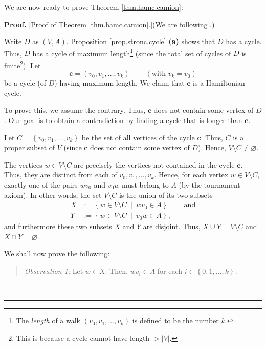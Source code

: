 \documentclass[numbers=enddot,12pt,final,onecolumn,notitlepage]{scrartcl}%
\numberwithin{exer}{subsection}
\theoremstyle{definition}
\newenvironment{statement}{\begin{quote}}{\end{quote}}
\newenvironment{proof}[1][Proof]{\noindent\textbf{#1.} }{\ \rule{0.5em}{0.5em}}
\begin{document}
We are now ready to prove Theorem \ref{thm.hamc.camion}:

\begin{proof}
[Proof of Theorem \ref{thm.hamc.camion}.](We are following \cite[\S 10.2,
Theorem 4]{Berge91}.)

Write $D$ as $\left(  V,A\right)  $. Proposition \ref{prop.stronc.cycle}
\textbf{(a)} shows that $D$ has a cycle. Thus, $D$ has a cycle of maximum
length\footnote{The \emph{length} of a walk $\left(  v_{0},v_{1},\ldots
,v_{k}\right)  $ is defined to be the number $k$.} (since the total set of
cycles of $D$ is finite\footnote{This is because a cycle cannot have length
$>\left\vert V\right\vert $.}). Let%
\[
\mathbf{c}=\left(  v_{0},v_{1},\ldots,v_{k}\right)
\ \ \ \ \ \ \ \ \ \ \left(  \text{with }v_{k}=v_{0}\right)
\]
be a cycle (of $D$) having maximum length. We claim that $\mathbf{c}$ is a
Hamiltonian cycle.

To prove this, we assume the contrary. Thus, $\mathbf{c}$ does not contain
some vertex of $D$. Our goal is to obtain a contradiction by finding a cycle
that is longer than $\mathbf{c}$.

Let $C=\left\{  v_{0},v_{1},\ldots,v_{k}\right\}  $ be the set of all vertices
of the cycle $\mathbf{c}$. Thus, $C$ is a proper subset of $V$ (since
$\mathbf{c}$ does not contain some vertex of $D$). Hence, $V\setminus
C\neq\varnothing$.

The vertices $w\in V\setminus C$ are precisely the vertices not contained in
the cycle $\mathbf{c}$. Thus, they are distinct from each of $v_{0}%
,v_{1},\ldots,v_{k}$. Hence, for each vertex $w\in V\setminus C$, exactly one
of the pairs $wv_{0}$ and $v_{0}w$ must belong to $A$ (by the tournament
axiom). In other words, the set $V\setminus C$ is the union of its two subsets%
\begin{align*}
X  &  :=\left\{  w\in V\setminus C\ \mid\ wv_{0}\in A\right\}
\ \ \ \ \ \ \ \ \ \ \text{and}\\
Y  &  :=\left\{  w\in V\setminus C\ \mid\ v_{0}w\in A\right\}  ,
\end{align*}
and furthermore these two subsets $X$ and $Y$ are disjoint. Thus, $X\cup
Y=V\setminus C$ and $X\cap Y=\varnothing$.

We shall now prove the following:

\begin{statement}
\textit{Observation 1:} Let $w\in X$. Then, $wv_{i}\in A$ for each
$i\in\left\{  0,1,\ldots,k\right\}  $.
\end{statement}


\end{proof}
\end{document}
